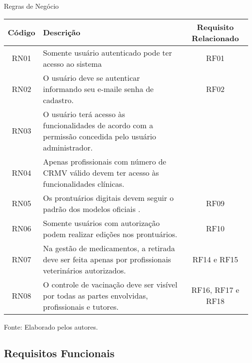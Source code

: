\documentclass[
    12pt,               %
    openright,          %
    oneside,
    a4paper,            %
    BIBLATEX,           %
    TODO,               %
    english,            %
    brazil              %
    ]{ifsp-spo-inf-ctds}
\providecommand{\DIFadd}[1]{{\protect\color{blue}\uwave{#1}}} %
\providecommand{\DIFaddbegin}{} %
\providecommand{\DIFaddend}{} %
\newcommand{\DIFaddincludegraphics}[2][]{{\color{blue}\fbox{\DIFOincludegraphics[#1]{#2}}}} %
\DeclareRobustCommand{\DIFaddbegin}{\DIFOaddbegin \let\includegraphics\DIFaddincludegraphics} %
\DeclareRobustCommand{\DIFaddend}{\DIFOaddend \let\includegraphics\DIFOincludegraphics} %
\begin{document}
            \begin{center}
                \begin{quadro}[H]
                \caption{Regras de Negócio}
                \begin{tabulary}{1.0\textwidth}{|C|p{23em}|C|}
                \hline

                 Código & Descrição & Requisito Relacionado\\
                \hline
                RN01 & Somente usuário autenticado pode ter acesso ao sistema & RF01\\
                \hline
                RN02 & O usuário deve se autenticar informando seu e-mail\DIFaddbegin \DIFadd{, código da clínica }\DIFaddend e senha de cadastro. & RF02\\
                \hline
                RN03 & O usuário terá acesso às funcionalidades de acordo com a permissão concedida pelo usuário administrador. & \\
                \hline
                RN04 & Apenas profissionais com número de CRMV válido devem ter acesso às funcionalidades clínicas. & \\
                \hline
                RN05 & Os prontuários digitais devem seguir o padrão dos modelos oficiais . & RF09\\
                \hline
                RN06 & Somente usuários com autorização podem realizar edições nos prontuários. & RF10\\
                \hline
                RN07 & Na gestão de medicamentos, a retirada deve ser feita apenas por profissionais veterinários autorizados. & RF14 e RF15\\
                \hline
                RN08 & O controle de vacinação deve ser visível por todas as partes envolvidas, profissionais e tutores. & RF16, RF17 e RF18\\
                \hline
                \end{tabulary}   
                \label{tab:regra}
                \centering
                \footnotesize {Fonte: Elaborado pelos autores.}
                \end{quadro}
            \end{center}

        \subsection{Requisitos Funcionais}
\end{document}
